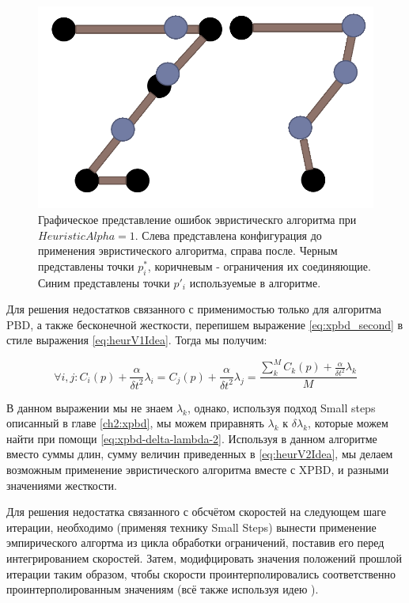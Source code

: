 	\begin{figure}[ht!] 
		\center
		\includegraphics [scale=0.4] {my_folder/images//heuristicSchemaFail}
		\caption{Графическое представление ошибок эвристическго алгоритма при $HeuristicAlpha = 1$. Слева представлена конфигурация до применения эвристического алгоритма, справа после. Черным представлены точки $p^*_i$, коричневым - ограничения их соединяющие. Синим представлены точки $p'_i$ используемые в алгоритме.}
		\label{fig:heuristicSchemaFail}  
	\end{figure}	
	\FloatBarrier 
	
	Для решения недостатков связанного с применимостью только для алгоритма PBD, а также бесконечной жесткости, перепишем выражение \ref{eq:xpbd_second} в стиле выражения \ref{eq:heurV1Idea}. Тогда мы получим:
	
	\begin{equation} \label{eq:heurV2Idea}
		\forall i,j : C_i(p) + \frac{\alpha}{\delta t^2}\lambda_i = C_j(p) + \frac{\alpha}{\delta t^2}\lambda_j = \frac{\sum_k^M C_k(p) + \frac{\alpha}{\delta t^2}\lambda_k}{M}
	\end{equation}
	
	В данном выражении мы не знаем $\lambda_k$, однако, используя подход Small steps описанный в главе \ref{ch2:xpbd}, мы можем приравнять $\lambda_k$ к $\delta \lambda_k$, которые можем найти при помощи \ref{eq:xpbd-delta-lambda-2}. Используя в данном алгоритме вместо суммы длин, сумму величин приведенных в \ref{eq:heurV2Idea}, мы делаем возможным применение эвристического алгоритма вместе с XPBD, и разными значениями жесткости.
	
	Для решения недостатка связанного с обсчётом скоростей на следующем шаге итерации, необходимо (применяя технику Small Steps) вынести применение эмпирического алгортма из цикла обработки ограничений, поставив его перед интегрированием скоростей. Затем, модифцировать значения положений прошлой итерации таким образом, чтобы скорости проинтерполировались соответственно проинтерполированным значениям (всё также используя идею ).
	
